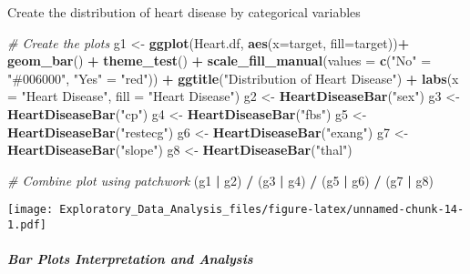 \documentclass[
]{article}
\newenvironment{Shaded}{\begin{snugshade}}{\end{snugshade}}
\newcommand{\AttributeTok}[1]{\textcolor[rgb]{0.13,0.29,0.53}{#1}}
\newcommand{\CommentTok}[1]{\textcolor[rgb]{0.56,0.35,0.01}{\textit{#1}}}
\newcommand{\FunctionTok}[1]{\textcolor[rgb]{0.13,0.29,0.53}{\textbf{#1}}}
\newcommand{\NormalTok}[1]{#1}
\newcommand{\OtherTok}[1]{\textcolor[rgb]{0.56,0.35,0.01}{#1}}
\newcommand{\SpecialCharTok}[1]{\textcolor[rgb]{0.81,0.36,0.00}{\textbf{#1}}}
\newcommand{\StringTok}[1]{\textcolor[rgb]{0.31,0.60,0.02}{#1}}
\begin{document}
Create the distribution of heart disease by categorical variables

\begin{Shaded}
\begin{Highlighting}[]
\CommentTok{\# Create the plots}
\NormalTok{g1 }\OtherTok{\textless{}{-}} \FunctionTok{ggplot}\NormalTok{(Heart.df, }\FunctionTok{aes}\NormalTok{(}\AttributeTok{x=}\NormalTok{target, }\AttributeTok{fill=}\NormalTok{target))}\SpecialCharTok{+}
  \FunctionTok{geom\_bar}\NormalTok{() }\SpecialCharTok{+} \FunctionTok{theme\_test}\NormalTok{() }\SpecialCharTok{+}
  \FunctionTok{scale\_fill\_manual}\NormalTok{(}\AttributeTok{values =} \FunctionTok{c}\NormalTok{(}\StringTok{"No"} \OtherTok{=} \StringTok{"\#006000"}\NormalTok{, }\StringTok{"Yes"} \OtherTok{=} \StringTok{"red"}\NormalTok{)) }\SpecialCharTok{+}
  \FunctionTok{ggtitle}\NormalTok{(}\StringTok{"Distribution of Heart Disease"}\NormalTok{) }\SpecialCharTok{+}
  \FunctionTok{labs}\NormalTok{(}\AttributeTok{x =} \StringTok{"Heart Disease"}\NormalTok{, }\AttributeTok{fill =} \StringTok{"Heart Disease"}\NormalTok{)}
\NormalTok{g2 }\OtherTok{\textless{}{-}} \FunctionTok{HeartDiseaseBar}\NormalTok{(}\StringTok{"sex"}\NormalTok{)}
\NormalTok{g3 }\OtherTok{\textless{}{-}} \FunctionTok{HeartDiseaseBar}\NormalTok{(}\StringTok{"cp"}\NormalTok{)}
\NormalTok{g4 }\OtherTok{\textless{}{-}} \FunctionTok{HeartDiseaseBar}\NormalTok{(}\StringTok{"fbs"}\NormalTok{)}
\NormalTok{g5 }\OtherTok{\textless{}{-}} \FunctionTok{HeartDiseaseBar}\NormalTok{(}\StringTok{"restecg"}\NormalTok{)}
\NormalTok{g6 }\OtherTok{\textless{}{-}} \FunctionTok{HeartDiseaseBar}\NormalTok{(}\StringTok{"exang"}\NormalTok{)}
\NormalTok{g7 }\OtherTok{\textless{}{-}} \FunctionTok{HeartDiseaseBar}\NormalTok{(}\StringTok{"slope"}\NormalTok{)}
\NormalTok{g8 }\OtherTok{\textless{}{-}} \FunctionTok{HeartDiseaseBar}\NormalTok{(}\StringTok{"thal"}\NormalTok{)}

\CommentTok{\# Combine plot using patchwork}
\NormalTok{(g1 }\SpecialCharTok{|}\NormalTok{ g2) }\SpecialCharTok{/}
\NormalTok{(g3 }\SpecialCharTok{|}\NormalTok{ g4) }\SpecialCharTok{/}
\NormalTok{(g5 }\SpecialCharTok{|}\NormalTok{ g6) }\SpecialCharTok{/}
\NormalTok{(g7 }\SpecialCharTok{|}\NormalTok{ g8)}
\end{Highlighting}
\end{Shaded}

\texttt{[image: Exploratory\_Data\_Analysis\_files/figure-latex/unnamed-chunk-14-1.pdf]}

\subparagraph{\texorpdfstring{\textbf{Bar Plots Interpretation and
Analysis}}{Bar Plots Interpretation and Analysis}}\label{bar-plots-interpretation-and-analysis}
\end{document}
